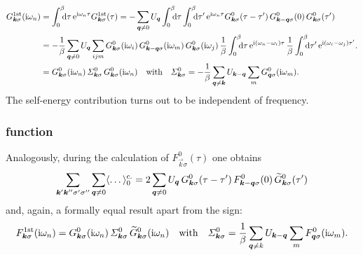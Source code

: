 %
\begin{align*}
    G \super{1st}_{\vec k \sigma}(\I \omega_n) &=
    \int \from 0 \till \beta \D \tau \, \E^{\I \omega_n \tau}
    G \super{1st}_{\vec k \sigma}(\tau)
    = -\sum_{\vec q \neq 0} U_{\vec q}
    \int \from 0 \till \beta \D \tau
    \int \from 0 \till \beta \D \tau' \,
    \E^{\I \omega_n \tau}
    G^0_{\vec k \sigma}(\tau - \tau') \,
    G^0_{\vec k - \vec q \sigma}(0) \,
    G^0_{\vec k \sigma}(\tau')
    \\
    &= -\frac 1 \beta \sum_{\vec q \neq 0} U_{\vec q} \sum_{i j m}
    G^0_{\vec k \sigma}(\I \omega_i) \,
    G^0_{\vec k - \vec q \sigma}(\I \omega_m) \,
    G^0_{\vec k \sigma}(\I \omega_j) \,
    \frac 1 \beta \int \from 0 \till \beta \D \tau \,
    \E^{\I (\omega_n - \omega_i) \tau} \,
    \frac 1 \beta \int \from 0 \till \beta \D \tau' \,
    \E^{\I (\omega_i - \omega_j) \tau'}.
    \\
    &= G^0_{\vec k \sigma}(\I \omega_n) \,
    \Sigma^0_{\vec k \sigma} \,
    G^0_{\vec k \sigma}(\I \omega_n)
    \quad \text{with} \quad
    \Sigma^0_{\vec k \sigma}
    = -\frac 1 \beta \sum_{\vec q \neq \vec k} U_{\vec k - \vec q}
    \sum_m G^0_{\vec q \sigma}(\I \omega_m).
\end{align*}
%
The self-energy contribution turns out to be independent of frequency.

\subsubsection{ function}

Analogously, during the calculation of $F^0_{\vec k \sigma}(\tau)$ one obtains
%
\begin{align*}
    \sum_{\boldsymbol k' \boldsymbol k'' \sigma' \sigma''} \sum_{\boldsymbol q \neq 0}
    \langle\dots\rangle_0 \sp{\text{c.}}
    = 2 \sum_{\boldsymbol q \neq 0} U_{\boldsymbol q} \,
    G^0_{\boldsymbol k \sigma}(\tau - \tau') \,
    F^0_{\boldsymbol k - \boldsymbol q \sigma}(0) \,
    \widetilde G^0_{\boldsymbol k \sigma}(\tau')
\end{align*}
%
and, again, a formally equal result apart from the sign:
%
\begin{equation*}
    F \sp{\text{1st}}_{\boldsymbol k \sigma}(\mathrm i \omega_n)
    = G^0_{\boldsymbol k \sigma}(\mathrm i \omega_n) \,
    \varSigma^0_{\boldsymbol k \sigma} \,
    \widetilde G^0_{\boldsymbol k \sigma}(\mathrm i \omega_n)
    \quad \text{with} \quad
    \varSigma^0_{\boldsymbol k \sigma}
    = \frac 1 \beta \sum_{\boldsymbol q \neq k} U_{\boldsymbol k - \boldsymbol q}
    \sum_m F^0_{\boldsymbol q \sigma}(\mathrm i \omega_m).
\end{equation*}

